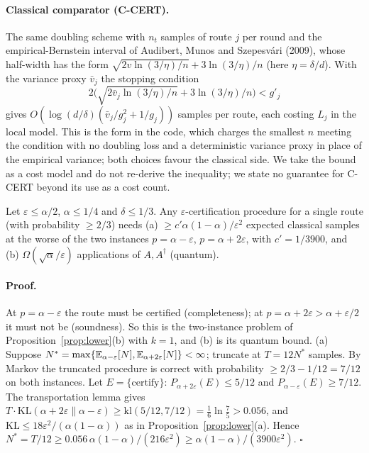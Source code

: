 \paragraph{Classical comparator (C-CERT).} The same doubling scheme with $n_t$ samples of route $j$ per round and the empirical-Bernstein interval of Audibert, Munos and Szepesv\'ari (2009), whose half-width has the form $\sqrt{2v\ln(3/\eta)/n}+3\ln(3/\eta)/n$ (here $\eta=\delta/d$). With the variance proxy $\bar v_j$ the stopping condition
\[2\Big(\sqrt{2\bar v_j\ln(3/\eta)/n}+3\ln(3/\eta)/n\Big)<g'_j\]
gives $O(\log(d/\delta)(\bar v_j/g_j^2+1/g_j))$ samples per route, each costing $L_j$ in the local model. This is the form in the code, which charges the smallest $n$ meeting the condition with no doubling loss and a deterministic variance proxy in place of the empirical variance; both choices favour the classical side. We take the bound as a cost model and do not re-derive the inequality; we state no guarantee for C-CERT beyond its use as a cost count.

\begin{proposition}\label{prop:routelower}
Let $\varepsilon\le\alpha/2$, $\alpha\le1/4$ and $\delta\le1/3$. Any $\varepsilon$-certification procedure for a single route (with probability $\ge2/3$) needs (a) $\ge c'\alpha(1-\alpha)/\varepsilon^2$ expected classical samples at the worse of the two instances $p=\alpha-\varepsilon$, $p=\alpha+2\varepsilon$, with $c'=1/3900$, and (b) $\Omega(\sqrt\alpha/\varepsilon)$ applications of $A,A^\dagger$ (quantum).
\end{proposition}
\paragraph{Proof.} At $p=\alpha-\varepsilon$ the route must be certified (completeness); at $p=\alpha+2\varepsilon>\alpha+\varepsilon/2$ it must not be (soundness). So this is the two-instance problem of Proposition~\ref{prop:lower}(b) with $k=1$, and (b) is its quantum bound. (a) Suppose $N^*=\max\{\mathbb{E}_{\alpha-\varepsilon}[N],\mathbb{E}_{\alpha+2\varepsilon}[N]\}<\infty$; truncate at $T=12N^*$ samples. By Markov the truncated procedure is correct with probability $\ge2/3-1/12=7/12$ on both instances. Let $E=\{\text{certify}\}$: $P_{\alpha+2\varepsilon}(E)\le5/12$ and $P_{\alpha-\varepsilon}(E)\ge7/12$. The transportation lemma \citep[Lemma 1]{KaufmannCappeGarivier2016} gives $T\cdot\mathrm{KL}(\alpha+2\varepsilon\|\alpha-\varepsilon)\ge\mathrm{kl}(5/12,7/12)=\tfrac16\ln\tfrac75>0.056$, and $\mathrm{KL}\le18\varepsilon^2/(\alpha(1-\alpha))$ as in Proposition~\ref{prop:lower}(a). Hence $N^*=T/12\ge0.056\,\alpha(1-\alpha)/(216\varepsilon^2)\ge\alpha(1-\alpha)/(3900\varepsilon^2)$. \hfill$\square$

